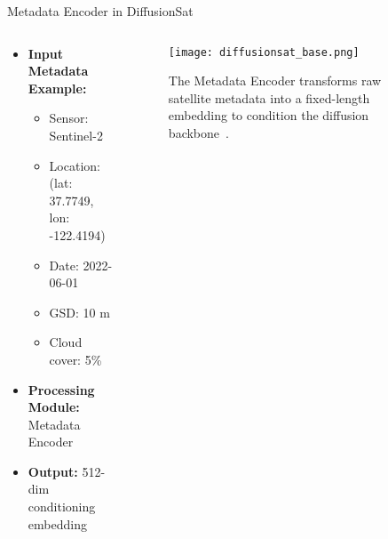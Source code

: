\begin{refsection}
  \begin{frame}{Metadata Encoder in DiffusionSat}
    \begin{columns}[t]
      \begin{column}{0.4\textwidth}
        \small
        \begin{itemize}
          \item \textbf{Input Metadata Example:}
          \begin{itemize}
            \item Sensor: Sentinel-2
            \item Location: (lat: 37.7749, lon: -122.4194)
            \item Date: 2022-06-01
            \item GSD: 10 m
            \item Cloud cover: 5\%
          \end{itemize}
          \item \textbf{Processing Module:} Metadata Encoder
          \item \textbf{Output:} 512-dim conditioning embedding
        \end{itemize}
      \end{column}
      \begin{column}{0.6\textwidth}
        \begin{figure}
          \centering
          \texttt{[image: diffusionsat\_base.png]}
          \caption{\scriptsize The Metadata Encoder transforms raw satellite metadata into a fixed-length embedding to condition the diffusion backbone~\parencite{diffusionset2024}.}
        \end{figure}
      \end{column}
    \end{columns}
    \bottomleftrefs
  \end{frame}
\end{refsection}

